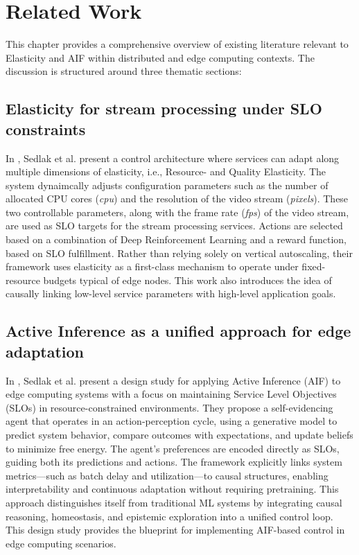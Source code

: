 \chapter{Related Work}
This chapter provides a comprehensive overview of existing literature relevant to Elasticity and AIF within distributed and edge computing contexts. The discussion is structured around three thematic sections: 

\section{Elasticity for stream processing under SLO constraints}
In \cite{sedlak_towards_2025}, Sedlak et al. present a control architecture where services can adapt along multiple dimensions of elasticity, i.e., Resource- and Quality Elasticity. The system dynaimcally adjusts configuration parameters such as the number of allocated CPU cores (\textit{cpu}) and the resolution of the video stream (\textit{pixels}). These two controllable parameters, along with the frame rate (\textit{fps}) of the video stream, are used as SLO targets for the stream processing services. Actions are selected based on a combination of Deep Reinforcement Learning and a reward function, based on SLO fulfillment. Rather than relying solely on vertical autoscaling, their framework uses elasticity as a first-class mechanism to operate under fixed-resource budgets typical of edge nodes. This work also introduces the idea of causally linking low-level service parameters with high-level application goals.

\section{Active Inference as a unified approach for edge adaptation}
In \cite{sedlak_active_2024}, Sedlak et al. present a design study for applying Active Inference (AIF) to edge computing systems with a focus on maintaining Service Level Objectives (SLOs) in resource-constrained environments. They propose a self-evidencing agent that operates in an action-perception cycle, using a generative model to predict system behavior, compare outcomes with expectations, and update beliefs to minimize free energy. The agent’s preferences are encoded directly as SLOs, guiding both its predictions and actions. The framework explicitly links system metrics—such as batch delay and utilization—to causal structures, enabling interpretability and continuous adaptation without requiring pretraining. This approach distinguishes itself from traditional ML systems by integrating causal reasoning, homeostasis, and epistemic exploration into a unified control loop. This design study provides the blueprint for implementing AIF-based control in edge computing scenarios.

